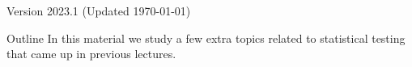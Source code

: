 \documentclass[aspectratio=169]{beamer}
\subtitle[Experimental Factors]{Topic 08 - Statistical Recipes}
\date{}
\begin{document}
\begin{frame}
  \maketitle

  \vfill

  \hfill \tiny{Version 2023.1 (Updated \today)}
\end{frame}

\begin{frame}[t]{Outline}
  In this material we study a few extra topics related to statistical testing
  that came up in previous lectures.
\end{frame}



%
%

  


\end{document}
